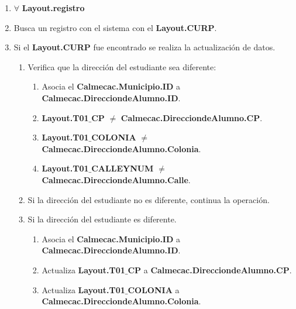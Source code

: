\begin{enumerate}
	
	\item $\forall$ \textbf{Layout.registro}
	
	\item Busca un registro con el sistema con el \textbf{Layout.CURP}.
	
	\item Si el \textbf{Layout.CURP} fue encontrado se realiza la actualización de datos.
	
		\begin{enumerate}
			
		\item Verifica que la dirección del estudiante sea diferente:
		
			\begin{enumerate}
	
			\item Asocia el \textbf{Calmecac.Municipio.ID} a \textbf{Calmecac.DirecciondeAlumno.ID}.
			
			\item \textbf{Layout.T01$\_$CP} $\neq$ \textbf{Calmecac.DirecciondeAlumno.CP}.
			
			\item \textbf{Layout.T01$\_$COLONIA} $\neq$ \textbf{Calmecac.DirecciondeAlumno.Colonia}.
			
			\item \textbf{Layout.T01$\_$CALLEYNUM} $\neq$ \textbf{Calmecac.DirecciondeAlumno.Calle}.
			
			\end{enumerate}
		
		\item Si la dirección del estudiante no es diferente, continua la operación.
		
		\item Si la dirección del estudiante es diferente.
		
			\begin{enumerate}
				
			\item Asocia el \textbf{Calmecac.Municipio.ID} a \textbf{Calmecac.DirecciondeAlumno.ID}.
			
			\item Actualiza \textbf{Layout.T01$\_$CP} a \textbf{Calmecac.DirecciondeAlumno.CP}.
			
			\item Actualiza \textbf{Layout.T01$\_$COLONIA} a \textbf{Calmecac.DirecciondeAlumno.Colonia}.
			

\end{enumerate}
\end{enumerate}
\end{enumerate}
